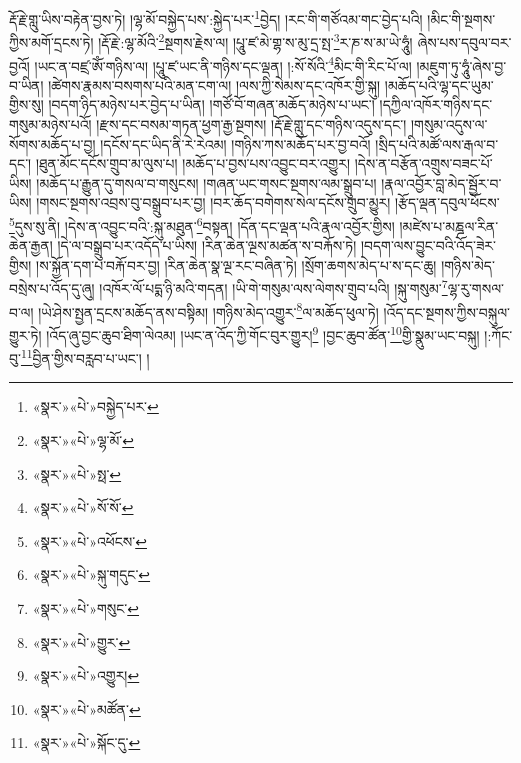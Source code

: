 རྡོ་རྗེ་གླུ་ཡིས་བརྟེན་བྱས་ཏེ། །ལྷ་མོ་བསྐྱེད་པས་:སྐྱེད་པར་\footnote{«སྣར་»«པེ་»བསྐྱེད་པར་}བྱེད། །རང་གི་གཙོའམ་གང་བྱེད་པའི། །མིང་གི་སྔགས་ཀྱིས་མགོ་དྲངས་ཏེ། །རྡོ་རྗེ་:ལྷ་མོའི་\footnote{«སྣར་»«པེ་»ལྷ་མོ་}སྔགས་རྗེས་ལ། །པཱུ་ཛ་མེ་གྷ་ས་མུ་དྲ་སྤ་\footnote{«སྣར་»«པེ་»སྥ་}ར་ཎ་ས་མ་ཡེ་ཧཱུཾ། ཞེས་པས་དབུལ་བར་བྱའོ། །ཡང་ན་བཛྲ་ཨོཾ་གཉིས་ལ། །པཱུ་ཛ་ཡང་ནི་གཉིས་དང་ལྡན། །:སོ་སོའི་\footnote{«སྣར་»«པེ་»སོ་སོ་}མིང་གི་རིང་པོ་ལ། །མཇུག་ཏུ་ཧཱུཾ་ཞེས་བྱ་བ་ཡིན། །ཚེགས་རྣམས་བསགས་པའི་མན་ངག་ལ། །ལས་ཀྱི་སེམས་དང་འཁོར་གྱི་སྐུ། །མཆོད་པའི་ལྷ་དང་ཡུམ་གྱིས་སུ། །བདག་ཉིད་མཉེས་པར་བྱེད་པ་ཡིན། །གཙོ་བོ་གཞན་མཆོད་མཉེས་པ་ཡང་། །དཀྱིལ་འཁོར་གཉིས་དང་གསུམ་མཉེས་པའོ། །རྫས་དང་བསམ་གཏན་ཕྱག་རྒྱ་སྔགས། །རྡོ་རྗེ་གླུ་དང་གཉིས་འདུས་དང་། །གསུམ་འདུས་ལ་སོགས་མཆོད་པ་བྱ། །དངོས་དང་ཡིད་ནི་རེ་རེའམ། །གཉིས་ཀས་མཆོད་པར་བྱ་བའོ། །སྲིད་པའི་མཚོ་ལས་རྒལ་བ་དང་། །ཐུན་མོང་དངོས་གྲུབ་མ་ལུས་པ། །མཆོད་པ་བྱས་པས་འབྱུང་བར་འགྱུར། །དེས་ན་བརྩོན་འགྲུས་བཟང་པོ་ཡིས། །མཆོད་པ་རྒྱུན་དུ་གསལ་བ་གསུངས། །གཞན་ཡང་གསང་སྔགས་ལམ་སྒྲུབ་པ། །རྣལ་འབྱོར་བླ་མེད་སྦྱོར་བ་ཡིས། །གསང་སྔགས་འབྲས་བུ་བསྒྲུབ་པར་བྱ། །བར་ཆོད་བགེགས་སེལ་དངོས་གྲུབ་མྱུར། །རྩོད་ལྡན་དབུལ་ཕོངས་\footnote{«སྣར་»«པེ་»འཕོངས་}དུས་སུ་ནི། །དེས་ན་འབྱུང་བའི་:སྐུ་མཐུན་\footnote{«སྣར་»«པེ་»སྐུ་གདུང་}བསྟན། །དོན་དང་ལྡན་པའི་རྣལ་འབྱོར་གྱིས། །མཛེས་པ་མཎྜལ་རིན་ཆེན་རྒྱན། །དེ་ལ་བསྒྲུབ་པར་འདོད་པ་ཡིས། །རིན་ཆེན་ལྔས་མཚན་ས་བརྐོས་ཏེ། །བདག་ལས་བྱུང་བའི་འོད་ཟེར་གྱིས། །ས་སྐྱོན་དག་པ་བརྐོ་བར་བྱ། །རིན་ཆེན་སྣ་ལྔ་རང་བཞིན་ཏེ། །སྲོག་ཆགས་མེད་པ་ས་དང་ཆུ། །གཉིས་མེད་བསྲེས་པ་འོད་དུ་ཞུ། །འཁོར་ལོ་པདྨ་ཉི་མའི་གདན། །ཡི་གེ་གསུམ་ལས་ལེགས་གྲུབ་པའི། །སྐུ་གསུམ་\footnote{«སྣར་»«པེ་»གསུང་}ལྷ་རུ་གསལ་བ་ལ། །ཡེ་ཤེས་སྤྱན་དྲངས་མཆོད་ནས་བསྟིམ། །གཉིས་མེད་འགྱུར་\footnote{«སྣར་»«པེ་»གྱུར་}ལ་མཆོད་ཕུལ་ཏེ། །འོད་དང་སྔགས་ཀྱིས་བསྐུལ་གྱུར་ཏེ། །འོད་ཞུ་བྱང་ཆུབ་ཐིག་ལེའམ། །ཡང་ན་འོད་ཀྱི་གོང་བུར་གྱུར།\footnote{«སྣར་»«པེ་»འགྱུར།} །བྱང་ཆུབ་ཚོན་\footnote{«སྣར་»«པེ་»མཚོན་}གྱི་སྣུམ་ཡང་བསྐུ། །:ཀོང་བུ་\footnote{«སྣར་»«པེ་»སྐོང་དུ་}བྱིན་གྱིས་བརླབ་པ་ཡང་། །
